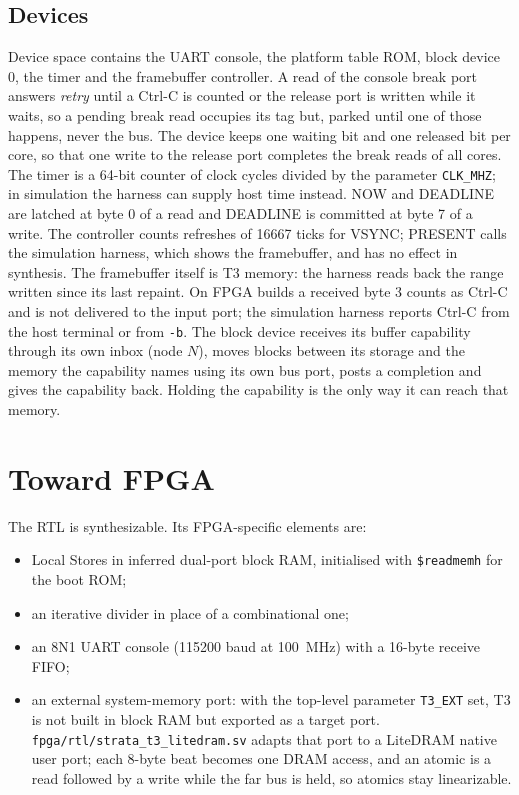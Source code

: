 \subsection{Devices}
Device space contains the UART console, the platform table ROM, block device 0, the timer and the
framebuffer controller. A read of the console break port answers \emph{retry} until a Ctrl-C is counted
or the release port is written while it waits, so a pending break read occupies its tag but, parked
until one of those happens, never the bus. The device keeps one waiting bit and one released bit per core, so that one write to the release
port completes the break reads of all cores. The timer is a 64-bit counter of clock cycles divided by
the parameter \texttt{CLK\_MHZ}; in simulation the harness can supply host time instead. NOW and
DEADLINE are latched at byte 0 of a read and DEADLINE is committed at byte 7 of a write. The
controller counts refreshes of 16667 ticks for VSYNC; PRESENT calls the simulation harness, which
shows the framebuffer, and has no effect in synthesis. The framebuffer itself is T3 memory: the
harness reads back the range written since its last repaint. On FPGA builds a received byte 3 counts as
Ctrl-C and is not delivered to the input port; the simulation harness reports Ctrl-C from the host
terminal or from \texttt{-b}. The block device
receives its buffer capability through its own inbox (node $N$), moves blocks between its storage and the
memory the capability names using its own bus port, posts a completion and gives the capability back.
Holding the capability is the only way it can reach that memory.

\section{Toward FPGA}

The RTL is synthesizable. Its FPGA-specific elements are:
\begin{itemize}
\item Local Stores in inferred dual-port block RAM, initialised with \texttt{\$readmemh} for the boot ROM;
\item an iterative divider in place of a combinational one;
\item an 8N1 UART console (115200 baud at 100~MHz) with a 16-byte receive FIFO;
\item an external system-memory port: with the top-level parameter \texttt{T3\_EXT} set, T3 is not built
  in block RAM but exported as a target port. \texttt{fpga/rtl/strata\_t3\_litedram.sv} adapts that port
  to a LiteDRAM native user port; each 8-byte beat becomes one DRAM access, and an atomic is a read
  followed by a write while the far bus is held, so atomics stay linearizable.
\end{itemize}

